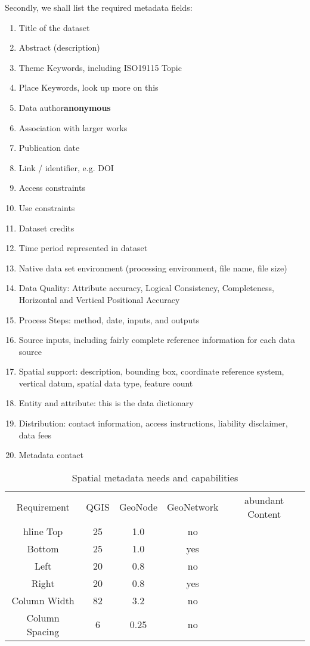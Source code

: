 \documentclass{isprs} %
\begin{document}
Secondly, we shall list the required metadata fields:

\begin{enumerate}
\setlength\itemsep{0em}\setlength\parskip{0em}\setlength\topsep{0em}\setlength\partopsep{0em}\setlength\parsep{0em} 
\item{Title of the dataset} 
\item{Abstract (description)}
\item{Theme Keywords, including ISO19115 Topic}
\item{Place Keywords, look up more on this}
\item{Data author\textbf{anonymous} }
\item{Association with larger works}
\item{Publication date}
\item{Link / identifier, e.g. DOI}
\item{Access constraints}
\item{Use constraints}
\item{Dataset credits}
\item{Time period represented in dataset}
\item{Native data set environment (processing environment, file name, file size)}
\item{Data Quality: Attribute accuracy, Logical Consistency, Completeness, Horizontal and Vertical Positional Accuracy}
\item{Process Steps: method, date, inputs, and outputs}
\item{Source inputs, including fairly complete reference information for each data source}
\item{Spatial support: description, bounding box, coordinate reference system, vertical datum, spatial data type, feature count}
\item{Entity and attribute: this is the data dictionary}
\item{Distribution: contact information, access instructions, liability disclaimer, data fees}
\item{Metadata contact}
\end{enumerate}

\begin{table*}[h]
	\centering
		\begin{tabular}{|c|c|c|c|c|}\hline
		    Requirement&QGIS&GeoNode&GeoNetwork&abundant Content\\hline
			 Top&25&1.0&no\\
			 Bottom&25&1.0&yes\\
			 Left&20&0.8&no\\
			 Right&20&0.8&yes\\
			 Column Width&82&3.2&no\\
			 Column Spacing&6&0.25&no\\\hline
		\end{tabular}
	\caption{Spatial metadata needs and capabilities}
\label{tab:Margin_settings}
\end{table*}
\end{document}
